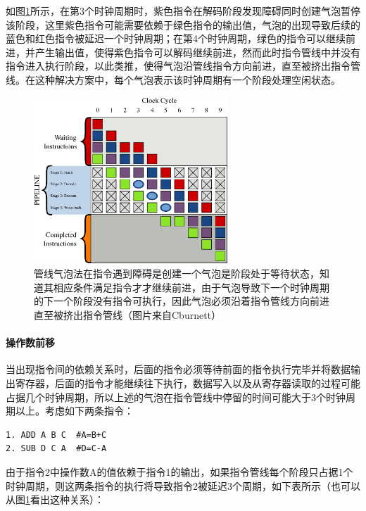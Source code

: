 如图\ref{f:rp-pipeline-bubble}所示，在第3个时钟周期时，紫色指令在解码阶段发现障碍同时创建气泡暂停该阶段，这里紫色指令可能需要依赖于绿色指令的输出值，气泡的出现导致后续的蓝色和红色指令被延迟一个时钟周期；在第4个时钟周期，绿色的指令可以继续前进，并产生输出值，使得紫色指令可以解码继续前进，然而此时指令管线中并没有指令进入执行阶段，以此类推，使得气泡沿管线指令方向前进，直至被挤出指令管线。在这种解决方案中，每个气泡表示该时钟周期有一个阶段处理空闲状态。

\begin{figure}
\sidecaption
	\includegraphics[width=0.65\textwidth]{figures/rp/Pipeline-bubble}
	\caption{管线气泡法在指令遇到障碍是创建一个气泡是阶段处于等待状态，知道其相应条件满足指令才才继续前进，由于气泡导致下一个时钟周期的下一个阶段没有指令可执行，因此气泡必须沿着指令管线方向前进直至被挤出指令管线（图片来自Cburnett）}
	\label{f:rp-pipeline-bubble}
\end{figure}




\paragraph{操作数前移}
当出现指令间的依赖关系时，后面的指令必须等待前面的指令执行完毕并将数据输出寄存器，后面的指令才能继续往下执行，数据写入以及从寄存器读取的过程可能占据几个时钟周期，所以上述的气泡在指令管线中停留的时间可能大于3个时钟周期以上。考虑如下两条指令：

\begin{lstlisting}
1. ADD A B C  #A=B+C
2. SUB D C A  #D=C-A
\end{lstlisting}

由于指令2中操作数A的值依赖于指令1的输出，如果指令管线每个阶段只占据1个时钟周期，则这两条指令的执行将导致指令2被延迟3个周期，如下表所示（也可以从图\ref{f:rp-pipeline-bubble}看出这种关系）：

